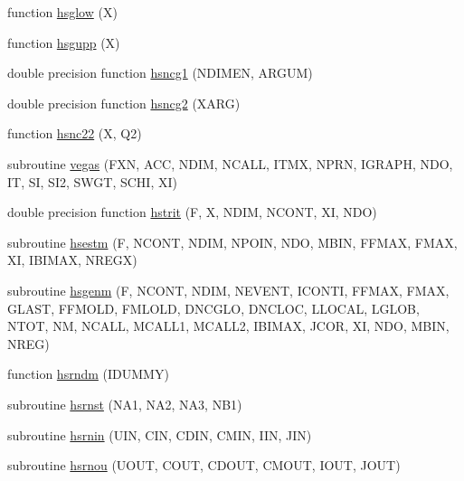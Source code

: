 \begin{DoxyCompactItemize}
function \hyperlink{djangoh__h_8f_ac1f8273b0185f0cb19a65eb54d54e898}{hsglow} (X)
\item 
function \hyperlink{djangoh__h_8f_a19674849abba63343ab6a1a42dccc95d}{hsgupp} (X)
\item 
double precision function \hyperlink{djangoh__h_8f_a23c10718fac8e43559d484a8630f63e1}{hsncg1} (N\+D\+I\+M\+E\+N, A\+R\+G\+U\+M)
\item 
double precision function \hyperlink{djangoh__h_8f_aec9f4d2739afacc2c32f3f9540ae100f}{hsncg2} (X\+A\+R\+G)
\item 
function \hyperlink{djangoh__h_8f_ad7d53866766435b499ef5948b8d30693}{hsnc22} (X, Q2)
\item 
subroutine \hyperlink{djangoh__h_8f_a750c00ba56a362780036ea85c5cac118}{vegas} (F\+X\+N, A\+C\+C, N\+D\+I\+M, N\+C\+A\+L\+L, I\+T\+M\+X, N\+P\+R\+N, I\+G\+R\+A\+P\+H, N\+D\+O, I\+T, S\+I, S\+I2, S\+W\+G\+T, S\+C\+H\+I, X\+I)
\item 
double precision function \hyperlink{djangoh__h_8f_a190b7128662078959f32a6f61d17ef7f}{hstrit} (F, X, N\+D\+I\+M, N\+C\+O\+N\+T, X\+I, N\+D\+O)
\item 
subroutine \hyperlink{djangoh__h_8f_a3f4574292ce416a17cece3e33361f485}{hsestm} (F, N\+C\+O\+N\+T, N\+D\+I\+M, N\+P\+O\+I\+N, N\+D\+O, M\+B\+I\+N, F\+F\+M\+A\+X, F\+M\+A\+X, X\+I, I\+B\+I\+M\+A\+X, N\+R\+E\+G\+X)
\item 
subroutine \hyperlink{djangoh__h_8f_a88b74428eb7112a650a7b7444915bdbc}{hsgenm} (F, N\+C\+O\+N\+T, N\+D\+I\+M, N\+E\+V\+E\+N\+T, I\+C\+O\+N\+T\+I, F\+F\+M\+A\+X, F\+M\+A\+X, G\+L\+A\+S\+T, F\+F\+M\+O\+L\+D, F\+M\+L\+O\+L\+D, D\+N\+C\+G\+L\+O, D\+N\+C\+L\+O\+C, L\+L\+O\+C\+A\+L, L\+G\+L\+O\+B, N\+T\+O\+T, N\+M, N\+C\+A\+L\+L, M\+C\+A\+L\+L1, M\+C\+A\+L\+L2, I\+B\+I\+M\+A\+X, J\+C\+O\+R, X\+I, N\+D\+O, M\+B\+I\+N, N\+R\+E\+G)
\item 
function \hyperlink{djangoh__h_8f_a895b8de31614861bceb4dbcfb33bee8e}{hsrndm} (I\+D\+U\+M\+M\+Y)
\item 
subroutine \hyperlink{djangoh__h_8f_a54e057d1ece2367e4e29d6b22165af73}{hsrnst} (N\+A1, N\+A2, N\+A3, N\+B1)
\item 
subroutine \hyperlink{djangoh__h_8f_aee80afbe7295985ce737632fea55347a}{hsrnin} (U\+I\+N, C\+I\+N, C\+D\+I\+N, C\+M\+I\+N, I\+I\+N, J\+I\+N)
\item 
subroutine \hyperlink{djangoh__h_8f_a0c8e4208bf8844ec9fe1475008626308}{hsrnou} (U\+O\+U\+T, C\+O\+U\+T, C\+D\+O\+U\+T, C\+M\+O\+U\+T, I\+O\+U\+T, J\+O\+U\+T)
\item 

\end{DoxyCompactItemize}
